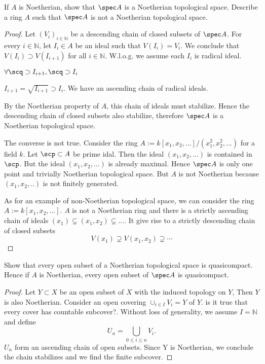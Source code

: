 \begin{exr}\label{chap3exr:Noetherian_rings_Noetherian_topological_spaces}
If $A$ is Noetherian, show that $\spec A$ is a Noetherian topological space. Describe a ring $A$ such that $\spec A$ is not a Noetherian topological space.
\end{exr}
\begin{proof}
Let $(V_i)_{i\in \mathbb{N}}$ be a descending chain of closed subsets of $\spec A$. For every $i\in\mathbb{N}$, let $I_i\in A$ be an ideal such that $V(I_i)=V_i$. We conclude that $V(I_i)\supset V(I_{i+1})$ for all $i\in \mathbb{N}$. W.l.o.g. we assume each $I_i$ is radical ideal.

$\forall \scq\supset I_{i+1}, \scq\supset I_i$

$
I_{i+1}=\sqrt{I_{i+1}}\supset I_i.
$
We have an ascending chain of radical ideals.

By the Noetherian property of $A$, this chain of ideals must stabilize. Hence the descending chain of closed subsets also stabilize, therefore $\spec A$ is a Noetherian topological space.

The converse is not true. Consider the ring $A:=k[x_1,x_2,...]/(x^2_1,x^2_2,...)$ for a field $k$. Let $\scp\subset A$ be prime idal. Then the ideal $(x_1,x_2,...)$ is contained in $\scp$. But the ideal $(x_1,x_2,...)$ is already maximal. Hence $\spec A$ is only one point and trivially Noetherian topological space. But $A$ is not Noetherian because $(x_1,x_2,..)$ is not finitely generated.

As for an example of non-Noetherian topological space, we can consider the ring $A:=k[x_1,x_2,...]$. $A$ is not a Noetherian ring and there is a strictly ascending chain of ideals $(x_1)\subsetneq (x_1,x_2)\subsetneq ...$. It give rise to a strictly descending chain of closed subsets
$$
V(x_1)\supsetneq V(x_1,x_2)\supsetneq\cdots
$$
\end{proof}
\begin{exr}\label{chap3exr:open_subset_Noetherian_space_quasicompact}
Show that every open subset of a Noetherian topological space is quasicompact. Hence if $A$ is Noetherian, every open subset of $\spec A$ is quasicompact.
\end{exr}
\begin{proof}
Let $Y\subset X$ be an open subset of $X$ with the induced topology on $Y$, Then $Y$ is also Noetherian. Consider an open covering $\cup_{i\in I}V_i=Y$ of $Y$. {\color{red}is it true that every cover has countable subcover?}. Without loss of generality, we assume $I=\mathbb{N}$ and define
$$
U_n=\bigcup_{0\leq i\leq n} V_i.
$$
$U_n$ form an ascending chain of open subsets. Since Y is Noetherian, we conclude the chain stabilizes
and we find the finite subcover.
\end{proof}

